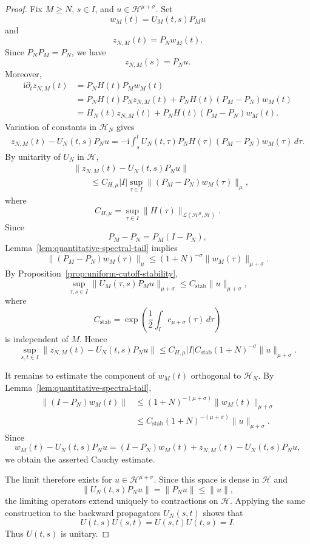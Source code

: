 \documentclass[10pt,a4paper]{amsart}
\newcommand{\Hilb}{\mathcal H}
\newcommand{\ii}{\mathrm i}
\begin{document}
\begin{proof}
Fix \(M\geq N\), \(s\in I\), and
\(u\in\Hilb^{\mu+\sigma}\). Set
\[
w_{M}(t)=U_{M}(t,s)P_{M}u
\]
and
\[
z_{N,M}(t)=P_{N}w_{M}(t).
\]
Since \(P_{N}P_{M}=P_{N}\), we have
\[
z_{N,M}(s)=P_{N}u.
\]
Moreover,
\[
\begin{split}
\ii\partial_{t}z_{N,M}(t)
&=
P_{N}H(t)P_{M}w_{M}(t)
\\
&=
P_{N}H(t)P_{N}z_{N,M}(t)
+
P_{N}H(t)(P_{M}-P_{N})w_{M}(t)
\\
&=
H_{N}(t)z_{N,M}(t)
+
P_{N}H(t)(P_{M}-P_{N})w_{M}(t).
\end{split}
\]
Variation of constants in \(\Hilb_{N}\) gives
\[
\begin{split}
z_{N,M}(t)-U_{N}(t,s)P_{N}u
=
-\ii
\int_{s}^{t}
U_{N}(t,\tau)
P_{N}H(\tau)(P_{M}-P_{N})w_{M}(\tau)\,d\tau.
\end{split}
\]
By unitarity of \(U_{N}\) in \(\Hilb\),
\[
\begin{split}
&\|z_{N,M}(t)-U_{N}(t,s)P_{N}u\|
\\
&\qquad\leq
C_{H,\mu}|I|
\sup_{\tau\in I}
\|(P_{M}-P_{N})w_{M}(\tau)\|_{\mu},
\end{split}
\]
where
\[
C_{H,\mu}
=
\sup_{\tau\in I}
\|H(\tau)\|_{\mathcal{L}(\Hilb^{\mu},\Hilb)}.
\]
Since
\[
P_{M}-P_{N}=P_{M}(I-P_{N}),
\]
Lemma~\ref{lem:quantitative-spectral-tail} implies
\[
\|(P_{M}-P_{N})w_{M}(\tau)\|_{\mu}
\leq
(1+N)^{-\sigma}\|w_{M}(\tau)\|_{\mu+\sigma}.
\]
By Proposition~\ref{prop:uniform-cutoff-stability},
\[
\sup_{\tau,s\in I}
\|U_{M}(\tau,s)P_{M}u\|_{\mu+\sigma}
\leq
C_{\mathrm{stab}}\|u\|_{\mu+\sigma},
\]
where
\[
C_{\mathrm{stab}}
=
\exp\left(
\frac{1}{2}\int_{I}c_{\mu+\sigma}(\tau)\,d\tau
\right)
\]
is independent of \(M\). Hence
\[
\sup_{s,t\in I}
\|z_{N,M}(t)-U_{N}(t,s)P_{N}u\|
\leq
C_{H,\mu}|I|C_{\mathrm{stab}}
(1+N)^{-\sigma}
\|u\|_{\mu+\sigma}.
\]

It remains to estimate the component of \(w_{M}(t)\) orthogonal to
\(\Hilb_{N}\). By Lemma~\ref{lem:quantitative-spectral-tail},
\[
\begin{split}
\|(I-P_{N})w_{M}(t)\|
&\leq
(1+N)^{-(\mu+\sigma)}
\|w_{M}(t)\|_{\mu+\sigma}
\\
&\leq
C_{\mathrm{stab}}
(1+N)^{-(\mu+\sigma)}
\|u\|_{\mu+\sigma}.
\end{split}
\]
Since
\[
w_{M}(t)-U_{N}(t,s)P_{N}u
=
(I-P_{N})w_{M}(t)
+
z_{N,M}(t)-U_{N}(t,s)P_{N}u,
\]
we obtain the asserted Cauchy estimate.

The limit therefore exists for
\(u\in\Hilb^{\mu+\sigma}\). Since this space is dense in
\(\Hilb\) and
\[
\|U_{N}(t,s)P_{N}u\|=\|P_{N}u\|\leq\|u\|,
\]
the limiting operators extend uniquely to contractions on \(\Hilb\).
Applying the same construction to the backward propagators \(U_{N}(s,t)\)
shows that
\[
U(t,s)U(s,t)=U(s,t)U(t,s)=I.
\]
Thus \(U(t,s)\) is unitary.


\end{proof}
\end{document}
